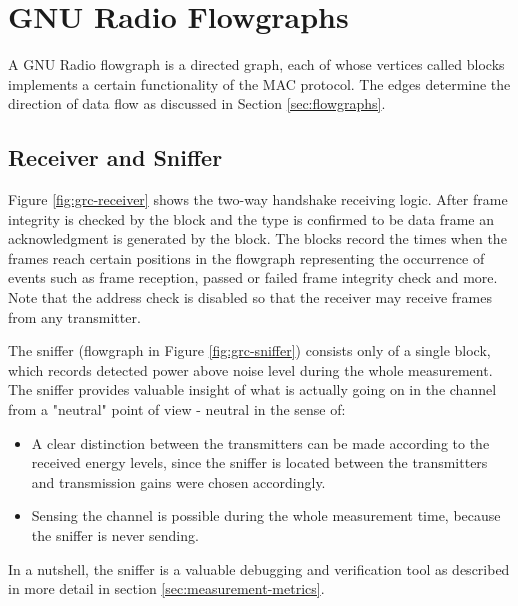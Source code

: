 \section{GNU Radio Flowgraphs}    

A GNU Radio flowgraph is a directed graph, each of whose vertices called blocks implements a certain functionality of the MAC protocol. The edges determine the direction of data flow as discussed in Section \ref{sec:flowgraphs}.

\subsection{Receiver and Sniffer}

Figure \ref{fig:grc-receiver} shows the two-way handshake receiving logic. After frame integrity is checked by the  block and the type is confirmed to be data frame an acknowledgment is generated by the  block. The  blocks record the times when the frames reach certain positions in the flowgraph representing the occurrence of events such as frame reception, passed or failed frame integrity check and more. Note that the address check is disabled so that the receiver may receive frames from any transmitter.

The sniffer (flowgraph in Figure \ref{fig:grc-sniffer}) consists only of a single  block, which records detected power above noise level during the whole measurement. The sniffer provides valuable insight of what is actually going on in the channel from a "neutral" point of view - neutral in the sense of:

\begin{itemize}
	\item A clear distinction between the transmitters can be made according to the received energy levels, since the sniffer is located between the transmitters and transmission gains were chosen accordingly.
	\item Sensing the channel is possible during the whole measurement time, because the sniffer is never sending.
\end{itemize}

In a nutshell, the sniffer is a valuable debugging and verification tool as described in more detail in section \ref{sec:measurement-metrics}.

